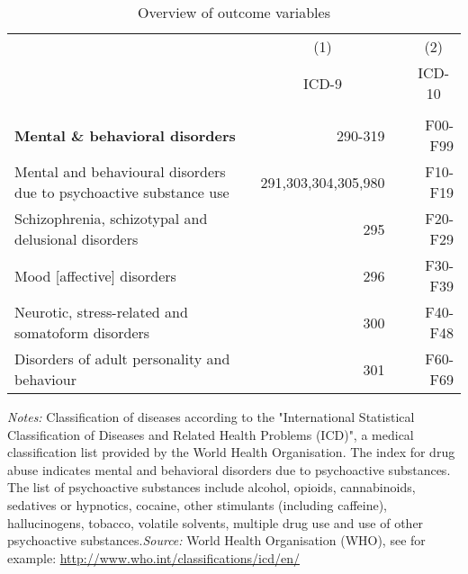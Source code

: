 \documentclass[11pt, a4paper]{article} %
\begin{document}
\begin{table}[h] %
\begin{threeparttable}
\centering %
\caption{Overview of outcome variables} %
\label{tab:outcomes_coding_main_chapters} 
\begin{tabular}{lrrr} %
\toprule %
        &\multicolumn{1}{c}{(1)}& &\multicolumn{1}{c}{(2)}\\
&\multicolumn{1}{c}{ICD-9} & & \multicolumn{1}{c}{ICD-10} \\ 
\midrule
\\
			\textbf{Mental \& behavioral  disorders}                             	&	290-319		& &		F00-F99 \\
\hspace{4pt} Mental and behavioural disorders due to psychoactive substance use & 291,303,304,305,980& & 	F10-F19 \\ 
\hspace{4pt} Schizophrenia, schizotypal and delusional disorders			& 295			& & 	F20-F29 \\
\hspace{4pt} Mood [affective] disorders										& 296			& & 	F30-F39 \\
\hspace{4pt} Neurotic, stress-related and somatoform disorders				& 300			& & 	F40-F48 \\
\hspace{4pt} Disorders of adult personality and behaviour 					& 301			& & 	F60-F69 \\		
\bottomrule %
\end{tabular}
\begin{tablenotes}
      \scriptsize{ \item \textit{Notes:} Classification of diseases according to the "International Statistical Classification of Diseases and Related Health Problems (ICD)", a medical classification list provided by the World Health Organisation. The index for drug abuse indicates mental and behavioral disorders due to psychoactive substances. The list of psychoactive substances include alcohol, opioids, cannabinoids, sedatives or hypnotics, cocaine, other stimulants (including caffeine), hallucinogens, tobacco, volatile solvents,  multiple drug use and use of other psychoactive substances.\newline \textit{Source:} World Health Organisation (WHO), see for example: \href{http://www.who.int/classifications/icd/en/}{http://www.who.int/classifications/icd/en/} }
    \end{tablenotes}
  \end{threeparttable}
\end{table}
\end{document}
